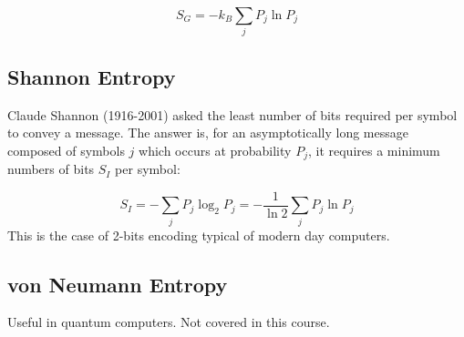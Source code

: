 \documentclass[12pt]{article}
\begin{document}
\[ S_G = -k_B\sum_jP_j \ln{P_j}\]

\subsection{Shannon Entropy}

Claude Shannon (1916-2001) asked the least number of bits required per symbol to convey a message. The answer is, for an asymptotically long message composed of symbols $j$ which occurs at probability $P_j$, it requires a minimum numbers of bits $S_I$ per symbol:

\[\boxed{S_I = -\sum_j P_j \log_2 P_j= -\frac{1}{\ln 2}\sum_j P_j \ln P_j}\]
This is the case of 2-bits encoding typical of modern day computers.

\subsection{von Neumann Entropy}
Useful in quantum computers. Not covered in this course.
\end{document}

